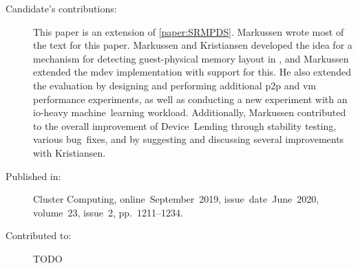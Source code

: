 \begin{description}
	\item[Candidate's contributions:]
		This paper is an extension of \cref{paper:SRMPDS}.
		Markussen wrote most of the text for this paper.
		Markussen and Kristiansen developed the idea for a mechanism for detecting guest-physical memory layout in , and Markussen
		extended the \acrshort{mdev} implementation with support for this.
		He also extended the evaluation by designing and performing additional \acrshort{p2p} and \acrshort{vm} performance experiments,
		as well as conducting a new experiment with an \gls{io}-heavy machine~learning workload.
		Additionally, Markussen contributed to the overall improvement of Device~Lending through stability testing, various bug~fixes,
		and by suggesting and discussing several improvements with Kristiansen.

	\item[Published in:]
		Cluster Computing,
		online~September~2019,
		issue~date~June~2020, 
		volume~23, issue~2, pp.~1211--1234.

	\item[Contributed to:]
		TODO

\end{description}
